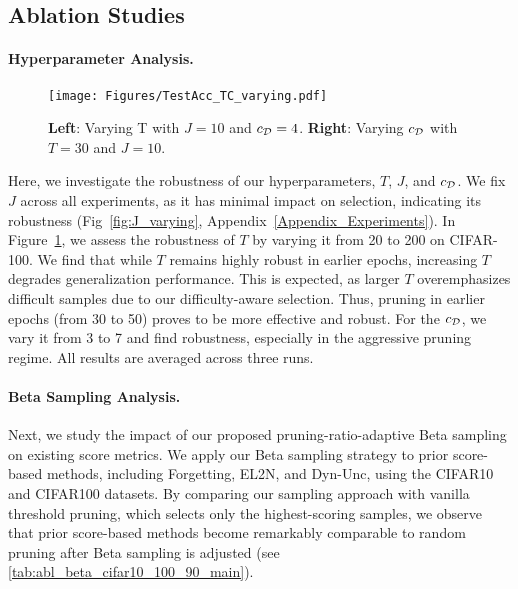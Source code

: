 \subsection{Ablation Studies}
\paragraph{Hyperparameter Analysis.}
\begin{wrapfigure}[10]{r}{0.5\textwidth}
\vspace{-5mm}
    \begin{center}
        \texttt{[image: Figures/TestAcc\_TC\_varying.pdf]}
    \end{center}
    \vspace{-5mm}
    \caption{\textbf{Left}: Varying T with $J=10$ and $c_{\mathcal{D}}=4$. \textbf{Right}: Varying $c_{\mathcal{D}}$ with $T=30$ and $J=10$.}
    \label{fig:TC_varying}
\end{wrapfigure}
Here, we investigate the robustness of our hyperparameters, $T$, $J$, and $c_{\mathcal{D}}$. We fix $J$ across all experiments, as it has minimal impact on selection, indicating its robustness (Fig~\ref{fig:J_varying}, Appendix~\ref{Appendix_Experiments}). In Figure~\ref{fig:TC_varying}, we assess the robustness of $T$ by varying it from 20 to 200 on CIFAR-100. We find that while $T$ remains highly robust in earlier epochs, increasing $T$ degrades generalization performance. This is expected, as larger $T$ overemphasizes difficult samples due to our difficulty-aware selection.  Thus, pruning in earlier epochs (from 30 to 50) proves to be more effective and robust. For the $c_{\mathcal{D}}$, we vary it from 3 to 7 and find robustness, especially in the aggressive pruning regime. All results are averaged across three runs.

\paragraph{Beta Sampling Analysis.}
Next, we study the impact of our proposed pruning-ratio-adaptive Beta sampling on existing score metrics. We apply our Beta sampling strategy to prior score-based methods, including Forgetting, EL2N, and Dyn-Unc, using the CIFAR10 and CIFAR100 datasets. By comparing our sampling approach with vanilla threshold pruning, which selects only the highest-scoring samples, we observe that prior score-based methods become remarkably comparable to random pruning after Beta sampling is adjusted (see \cref{tab:abl_beta_cifar10_100_90_main}).

